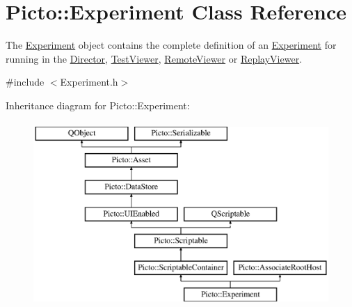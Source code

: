 \hypertarget{class_picto_1_1_experiment}{\section{Picto\-:\-:Experiment Class Reference}
\label{class_picto_1_1_experiment}
}


The \hyperlink{class_picto_1_1_experiment}{Experiment} object contains the complete definition of an \hyperlink{class_picto_1_1_experiment}{Experiment} for running in the \hyperlink{class_director}{Director}, \hyperlink{class_test_viewer}{Test\-Viewer}, \hyperlink{class_remote_viewer}{Remote\-Viewer} or \hyperlink{class_replay_viewer}{Replay\-Viewer}.  




{\ttfamily \#include $<$Experiment.\-h$>$}

Inheritance diagram for Picto\-:\-:Experiment\-:\begin{figure}[H]
\begin{center}
\leavevmode
\includegraphics[height=7.000000cm]{class_picto_1_1_experiment}
\end{center}
\end{figure}
